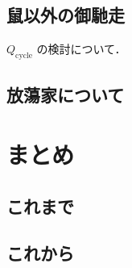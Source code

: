 \documentclass[
  leqno,
  twoside,
  numbers=noenddot,
]{scrbook}
\begin{document}
\begin{figure*} %
  \centering
\end{figure*}

\section{鼠以外の御馳走}
\begin{marginfigure}
  \centering
  \myGraph*{} %
  \caption{$Q_{\mathrm{cycle}}$ の検討について．
    \label{fig:4}}
\end{marginfigure}

\section{放蕩家について}

\mtoc 
\chapter{まとめ}

\section{これまで}


\section{これから}
\cite{Wasserman2004,Billingsley1999,HornJohnson1990,Hastie_etal2009}

\backmatter
\begin{otherlanguage}{english}
  \printbibliography[title=参考文献]
\end{otherlanguage}
\end{document}
